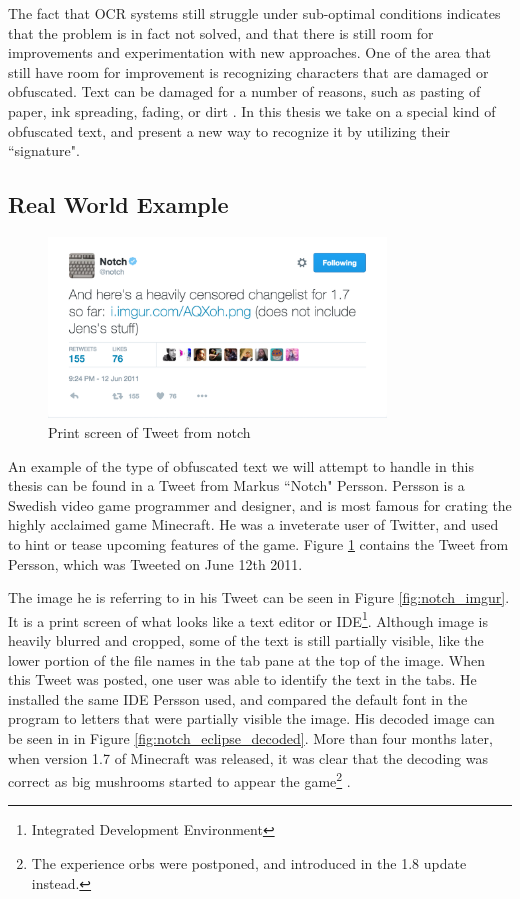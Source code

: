 The fact that OCR systems still struggle under sub-optimal conditions indicates that the problem is in fact not solved, and that there is still room for improvements and experimentation with new approaches. One of the area that still have room for improvement is recognizing characters that are damaged or obfuscated. Text can be damaged for a number of reasons, such as pasting of paper, ink spreading, fading, or dirt \citep{bhardwaj2014imaging}. In this thesis we take on a special kind of obfuscated text, and present a new way to recognize it by utilizing their ``signature".

\subsection{Real World Example}
\begin{figure}[ht]
    \centering
    \includegraphics[width=0.8\textwidth]{fig/chapter1/notch_tweet.png}
    \caption[Print screen of Tweet from notch]{Print screen of Tweet from notch}
    \label{ref:notch_twitter}
\end{figure}

An example of the type of obfuscated text we will attempt to handle in this thesis can be found in a Tweet from Markus ``Notch" Persson. Persson is a Swedish video game programmer and designer, and is most famous for crating the highly acclaimed game Minecraft. He was a inveterate user of Twitter, and used to hint or tease upcoming features of the game. Figure \ref{ref:notch_twitter} contains the Tweet from Persson, which was Tweeted on June 12th 2011.

The image he is referring to in his Tweet can be seen in Figure \ref{fig:notch_imgur}. It is a print screen of what looks like a text editor or IDE\footnote{Integrated Development Environment}. Although image is heavily blurred and cropped, some of the text is still partially visible, like the lower portion of the file names in the tab pane at the top of the image. When this Tweet was posted, one user was able to identify the text in the tabs. He installed the same IDE Persson used, and compared the default font in the program to letters that were partially visible the image. His decoded image can be seen in in Figure \ref{fig:notch_eclipse_decoded}. More than four months later, when version 1.7 of Minecraft was released, it was clear that the decoding was correct as big mushrooms started to appear the game\footnote{The experience orbs were postponed, and introduced in the 1.8 update instead.} \citep{misc-minecraft.172-changelog}.

